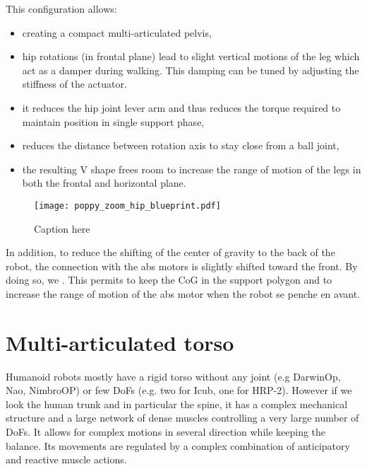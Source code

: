 This configuration allows:

\begin{itemize}
    \item creating a compact multi-articulated pelvis,
    \item hip rotations (in frontal plane) lead to slight vertical motions of the leg which act as a damper during walking. This damping can be tuned by adjusting the stiffness of the actuator.
    \item it reduces the hip joint lever arm and thus reduces the torque required to maintain position in single support phase,
    \item reduces the distance between rotation axis to stay close from a ball joint,
    \item the resulting V shape frees room to increase the range of motion of the legs in both the frontal and horizontal plane.
\end{itemize}

\begin{figure}[p]
    \begin{center}
        \texttt{[image: poppy\_zoom\_hip\_blueprint.pdf]}
    \end{center}
    \caption{Caption here}
    \label{fig:poppy_zoom_hip_blueprint}
\end{figure}

In addition, to reduce the shifting of the center of gravity to the back of the robot, the connection with the abs motors is slightly shifted toward the front. By doing so, we .
This permits to keep the CoG in the support polygon and to increase the range of motion of the abs motor when the robot se penche en avant.


\section{Multi-articulated torso} %

Humanoid robots mostly have a rigid torso without any joint (e.g DarwinOp, Nao, NimbroOP) or few DoFs (e.g. two for Icub, one for HRP-2). However if we look the human trunk and in particular the spine, it has a complex mechanical structure and a large network of dense muscles controlling a very large number of DoFs. It allows for complex motions in several direction while keeping the balance. Its movements are regulated by a complex combination of anticipatory and reactive muscle actions.


